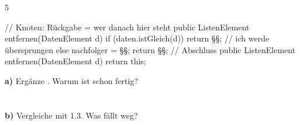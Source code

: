 \documentclass[11pt,a4paper]{article}
\begin{document}
\begin{aufgabe}{5}
\begin{minipage}[t]{0.52\linewidth}
\vspace{0pt}
\begin{java}[basicstyle=\ttfamily\scriptsize]
// Knoten: Rückgabe = wer danach hier steht
public ListenElement entfernen(DatenElement d) {
   if (daten.istGleich(d)) {
      return §§;   // ich werde übersprungen
   } else {
      nachfolger = §§;
      return §§;
   }
}
// Abschluss
public ListenElement entfernen(DatenElement d) {
   return this;
}
\end{java}
\end{minipage}\hfill
\begin{minipage}[t]{0.45\linewidth}
\vspace{0pt}\raggedright
\textbf{a)} Ergänze . Warum ist  schon fertig?\\
\\[1mm]
\\[1.5mm]
\textbf{b)} Vergleiche mit 1.3. Was fällt weg?\\
\\[1mm]
\end{minipage}
\end{aufgabe}
\end{document}
